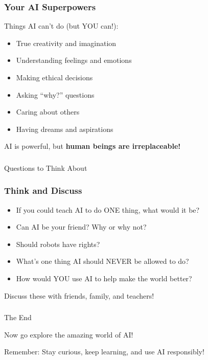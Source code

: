 \begin{frame}[fragile]\frametitle{Your AI Superpowers}

Things AI can't do (but YOU can!):
\begin{itemize}
\item True creativity and imagination
\item Understanding feelings and emotions
\item Making ethical decisions
\item Asking ``why?'' questions
\item Caring about others
\item Having dreams and aspirations
\end{itemize}

\vspace{0.5cm}
AI is powerful, but {\bf human beings are irreplaceable!}
\end{frame}

\begin{frame}[fragile]\frametitle{}
\begin{center}
{\Large Questions to Think About}
\end{center}
\end{frame}

\begin{frame}[fragile]\frametitle{Think and Discuss}
\begin{itemize}
\item If you could teach AI to do ONE thing, what would it be?
\item Can AI be your friend? Why or why not?
\item Should robots have rights?
\item What's one thing AI should NEVER be allowed to do?
\item How would YOU use AI to help make the world better?
\end{itemize}

\vspace{0.5cm}
Discuss these with friends, family, and teachers!
\end{frame}

\begin{frame}[fragile]\frametitle{}
\begin{center}
{\Huge The End}

\vspace{1cm}
{\Large Now go explore the amazing world of AI!}

\vspace{0.5cm}
Remember: Stay curious, keep learning, and use AI responsibly!
\end{center}
\end{frame}

